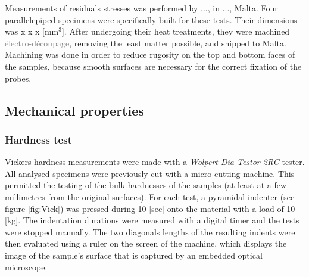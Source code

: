 Measurements of residuals stresses was performed by ..., in ..., Malta. Four parallelepiped specimens were specifically built for these tests. Their dimensions was x  x  x [mm$^3$]. After undergoing their heat treatments, they were machined \textcolor{gray}{électro-découpage}, removing the least matter possible, and shipped to Malta. Machining was done in order to reduce rugosity on the top and bottom faces of the samples, because smooth surfaces are necessary for the correct fixation of the probes. \\



\subsection{Mechanical properties}

\subsubsection{Hardness test}

Vickers hardness measurements were made with a \textit{Wolpert Dia-Testor 2RC} tester. All analysed specimens were previously cut with a micro-cutting machine. This permitted the testing of the bulk hardnesses of the samples (at least at a few millimetres from the original surfaces). For each test, a pyramidal indenter (see figure \ref{fig:Vick}) was pressed during 10 [sec] onto the material with a load of 10 [kg]. The indentation durations were measured with a digital timer and the tests were stopped manually. The two diagonals lengths of the resulting indents were then evaluated using a ruler on the screen of the machine, which displays the image of the sample's surface that is captured by an embedded optical microscope.\\

